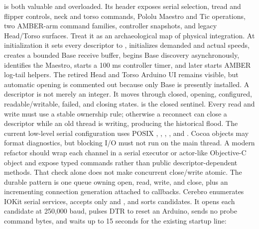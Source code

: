 {} is both valuable and overloaded. Its header exposes serial selection, tread and flipper controls, neck and torso commands, Pololu Maestro and Tic operations, two AMBER-arm command families, controller snapshots, and legacy Head/Torso surfaces. Treat it as an archaeological map of physical integration.\markdownRendererParagraphSeparator
{}At initialization it sets every descriptor to , initializes demanded and actual speeds, creates a bounded Base receive buffer, begins Base discovery asynchronously, identifies the Maestro, starts a 100 ms controller timer, and later starts AMBER log-tail helpers. The retired Head and Torso Arduino UI remains visible, but automatic opening is commented out because only Base is presently installed.\markdownRendererInterblockSeparator
{}\markdownRendererSectionBegin
{}\markdownRendererInterblockSeparator
{}A descriptor is not merely an integer. It moves through closed, opening, configured, readable/writable, failed, and closing states.  is the closed sentinel. Every read and write must use a stable ownership rule; otherwise a reconnect can close a descriptor while an old thread is writing, producing the historical  flood.\markdownRendererParagraphSeparator
{}The current low-level serial configuration uses POSIX , , , , and . Cocoa objects may format diagnostics, but blocking I/O must not run on the main thread. A modern refactor should wrap each channel in a serial executor or actor-like Objective-C object and expose typed commands rather than public descriptor-dependent methods.\markdownRendererInterblockSeparator
{}\markdownRendererInterblockSeparator
{}That check alone does not make concurrent close/write atomic. The durable pattern is one queue owning open, read, write, and close, plus an incrementing connection generation attached to callbacks.\markdownRendererInterblockSeparator
{}
\markdownRendererSectionEnd 
\markdownRendererSectionEnd \markdownRendererSectionBegin
{}\markdownRendererInterblockSeparator
{}Cerebro enumerates IOKit serial services, accepts only  and , and sorts candidates. It opens each candidate at 250,000 baud, pulses DTR to reset an Arduino, sends no probe command bytes, and waits up to 15 seconds for the existing startup line:\markdownRendererInterblockSeparator

